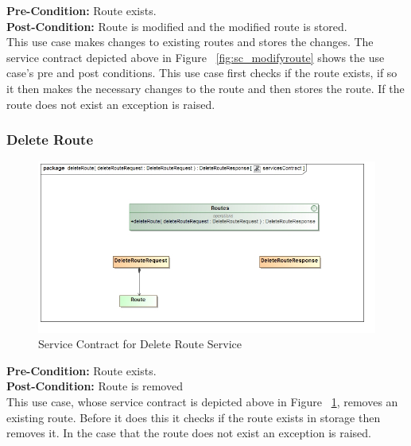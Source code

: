 \documentclass[a4paper,12pt]{article}
\begin{document}
\textbf{Pre-Condition: }
Route exists.\\
\textbf{Post-Condition: }
Route is modified and the modified route is stored.\\

This use case makes changes to existing routes and stores the changes. The service contract depicted above in Figure ~\ref{fig:sc_modifyroute} shows the use case's pre and post conditions. This use case first checks if the route exists, if so it then makes the necessary changes to the route and then stores the route. If the route does not exist an exception is raised. 
\subsubsection{Delete Route}

\begin{figure}[ht]
\includegraphics[width=\textwidth]{images/scDelete_Route.jpg}
\caption{Service Contract for Delete Route Service}
\label{fig:sc_deleteroute}
\end{figure}

\textbf{Pre-Condition: }
Route exists.\\
\textbf{Post-Condition: }
Route is removed\\
This use case, whose service contract is depicted above in Figure ~\ref{fig:sc_deleteroute}, removes an existing route. Before it does this it checks if the route exists in storage then removes it. In the case that the route does not exist an exception is raised.
\end{document}
